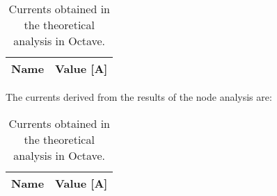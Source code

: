 \begin{table}[h]
  \centering
  \begin{tabular}{|l|r|}
    \hline    
    {\bf Name} & {\bf Value [A]} \\ \hline
	
  \end{tabular}
  \caption{Currents obtained in the theoretical analysis in Octave.}
  \label{tab:octave_currents}
\end{table}
The currents derived from the results of the node analysis are:
\begin{table}[h]
  \centering
  \begin{tabular}{|l|r|}
    \hline    
    {\bf Name} & {\bf Value [A]} \\ \hline
	
  \end{tabular}
  \caption{Currents obtained in the theoretical analysis in Octave.}
  \label{tab:octave_currents}
\end{table}

